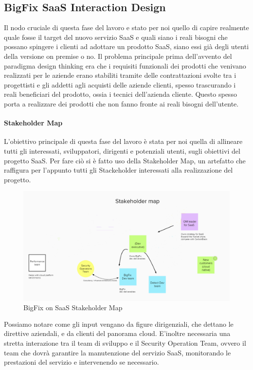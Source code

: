 \subsection{BigFix SaaS Interaction Design}
Il nodo cruciale di questa fase del lavoro e stato per noi quello di capire realmente quale fosse il target del nuovo servizio SaaS e quali siano i reali bisogni che possano spingere i clienti ad adottare un prodotto SaaS, siano essi già degli utenti della versione on premise o no. Il problema principale prima dell'avvento del paradigma design thinking era che i requisiti funzionali dei prodotti che venivano realizzati per le aziende erano stabiliti tramite delle contrattazioni svolte tra i progettisti e gli addetti agli acquisti delle aziende clienti, spesso trascurando i reali beneficiari del prodotto, ossia i tecnici dell'azienda cliente. Questo spesso porta a realizzare dei prodotti che non fanno fronte ai reali bisogni dell'utente. 


\paragraph{Stakeholder Map}
L'obiettivo principale di questa fase del lavoro è stata per noi quella di allineare tutti gli interessati, sviluppatori, dirigenti e potenziali utenti, sugli obiettivi del progetto SaaS. Per fare ciò si è fatto uso della Stakeholder Map, un artefatto che raffigura per l'appunto tutti gli Stackeholder interessati alla realizzazione del progetto. 
\begin{figure}[h!]
	\centering
	\includegraphics[width=\textwidth,keepaspectratio=true]{capitoli/imgs/StakeholderMap.PNG}
	\caption{BigFix on SaaS Stakeholder Map}
\end{figure}
Possiamo notare come gli input vengano da figure dirigenziali, che dettano le direttive aziendali, e da clienti del panorama cloud. E'inoltre necessaria una stretta interazione tra il team di sviluppo e il Security Operation Team, ovvero il team che dovrà garantire la manutenzione del servizio SaaS, monitorando le prestazioni del servizio e intervenendo se necessario.

